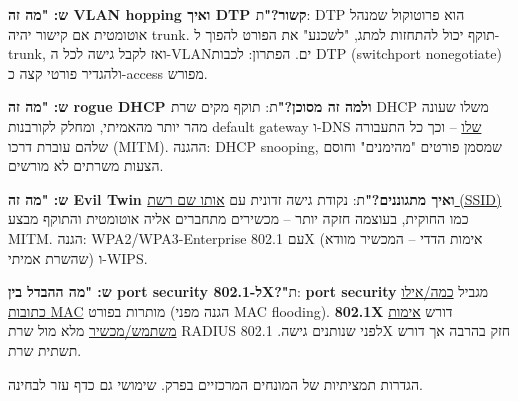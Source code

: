 \documentclass[11pt]{article}
\newcommand{\enLR}[1]{\textenglish{#1}}
\newcommand{\code}[1]{\textenglish{\codefont #1}}
\newcommand{\sectionheading}[1]{\vskip10pt\penalty-200{\large\bfseries\color{h2}#1\par}\vskip3pt}
\begin{document}
\textbf{ש: "מה זה \enLR{VLAN hopping} ואיך \enLR{DTP} קשור?"}\newline ת: \enLR{DTP} הוא פרוטוקול שמנהל אוטומטית אם קישור יהיה \enLR{trunk.} תוקף יכול להתחזות למתג, "לשכנע" את הפורט להפוך ל-\enLR{trunk}, ואז לקבל גישה לכל ה-\enLR{VLAN}ים. הפתרון: לכבות \enLR{DTP} (\code{switchport nonegotiate}) ולהגדיר פורטי קצה כ-\enLR{access} מפורש.\par

\textbf{ש: "מה זה \enLR{rogue DHCP} ולמה זה מסוכן?"}\newline ת: תוקף מקים שרת \enLR{DHCP} משלו שעונה מהר יותר מהאמיתי, ומחלק לקורבנות \enLR{default gateway} ו-\enLR{DNS} \underline{שלו} – וכך כל התעבורה שלהם עוברת דרכו \enLR{(MITM).} ההגנה: \enLR{DHCP snooping}, שמסמן פורטים "מהימנים" וחוסם הצעות משרתים לא מורשים.\par

\textbf{ש: "מה זה \enLR{Evil Twin} ואיך מתגוננים?"}\newline ת: נקודת גישה זדונית עם \underline{אותו שם רשת \enLR{(SSID)}} כמו החוקית, בעוצמה חזקה יותר – מכשירים מתחברים אליה אוטומטית והתוקף מבצע \enLR{MITM.} הגנה: \enLR{WPA2/WPA3-Enterprise} עם \enLR{802.1X} (אימות הדדי – המכשיר מוודא שהשרת אמיתי) ו-\enLR{WIPS.}\par

\textbf{ש: "מה ההבדל בין \enLR{port security} ל-\enLR{802.1X}?"}\newline ת: \textbf{\enLR{port security}} מגביל \underline{כמה/אילו כתובות \enLR{MAC}} מותרות בפורט (הגנה מפני \enLR{MAC flooding).} \textbf{\enLR{802.1X}} דורש \underline{אימות משתמש/מכשיר} מלא מול שרת \enLR{RADIUS} לפני שנותנים גישה. \enLR{802.1X} חזק בהרבה אך דורש תשתית שרת.\par

\sectionheading{מילון מונחים – הגדרות}

הגדרות תמציתיות של המונחים המרכזיים בפרק. שימושי גם כדף עזר לבחינה.\par
\end{document}
